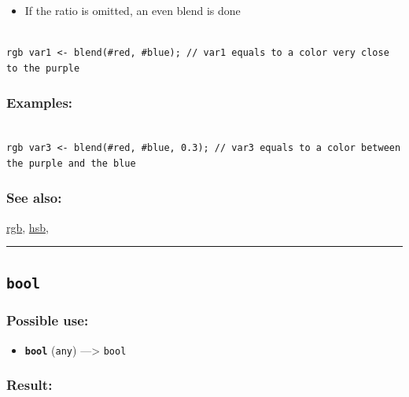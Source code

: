 \documentclass[]{book}
\providecommand{\tightlist}{%
  \setlength{\itemsep}{0pt}\setlength{\parskip}{0pt}}
\theoremstyle{definition}
\theoremstyle{definition}
\theoremstyle{definition}
\theoremstyle{remark}
\begin{document}
\begin{itemize}
\tightlist
\item
  If the ratio is omitted, an even blend is done
\end{itemize}

\begin{verbatim}
 
rgb var1 <- blend(#red, #blue); // var1 equals to a color very close to the purple
\end{verbatim}

\subsubsection{Examples:}\label{examples-57}

\begin{verbatim}
 
rgb var3 <- blend(#red, #blue, 0.3); // var3 equals to a color between the purple and the blue
\end{verbatim}

\subsubsection{See also:}\label{see-also-46}

\href{operators-n-to-r.html\#rgb}{rgb},
\href{operators-d-to-h.html\#hsb}{hsb},

\begin{center}\rule{0.5\linewidth}{\linethickness}\end{center}

\subsection{\texorpdfstring{\texttt{bool}}{bool}}\label{bool}

\subsubsection{Possible use:}\label{possible-use-75}

\begin{itemize}
\tightlist
\item
  \textbf{\texttt{bool}} (\texttt{any}) ---\textgreater{} \texttt{bool}
\end{itemize}

\subsubsection{Result:}\label{result-74}
\end{document}
